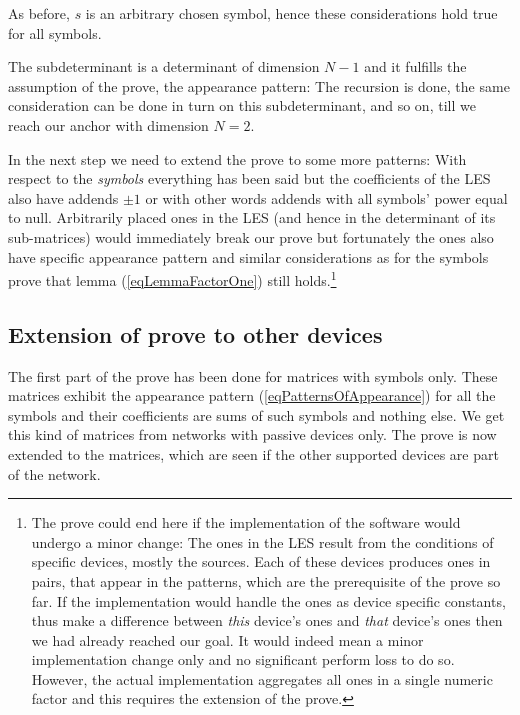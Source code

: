 As before, $s$ is an arbitrary chosen symbol, hence these considerations
hold true for all symbols.

The subdeterminant is a determinant of dimension $N-1$ and it fulfills the
assumption of the prove, the appearance pattern: The recursion is done,
the same consideration can be done in turn on this subdeterminant, and so
on, till we reach our anchor with dimension $N=2$.

In the next step we need to extend the prove to some more patterns: With
respect to the \emph{symbols} everything has been said but the
coefficients of the LES also have addends $\pm 1$ or with other words
addends with all symbols' power equal to null. Arbitrarily placed ones in
the LES (and hence in the determinant of its sub-matrices) would
immediately break our prove but fortunately the ones also have specific
appearance pattern and similar considerations as for the symbols prove
that lemma (\ref{eqLemmaFactorOne}) still holds.\footnote{The prove could
end here if the implementation of the software would undergo a minor
change: The ones in the LES result from the conditions of specific
devices, mostly the sources. Each of these devices produces ones in pairs,
that appear in the patterns, which are the prerequisite of the prove so
far. If the implementation would handle the ones as device specific
constants, thus make a difference between \emph{this} device's ones and
\emph{that} device's ones then we had already reached our goal. It would
indeed mean a minor implementation change only and no significant perform
loss to do so. However, the actual implementation aggregates all ones in a
single numeric factor and this requires the extension of the prove.}


\subsection{Extension of prove to other devices}

The first part of the prove has been done for matrices with symbols only.
These matrices exhibit the appearance pattern
(\ref{eqPatternsOfAppearance}) for all the symbols and their coefficients
are sums of such symbols and nothing else. We get this kind of matrices
from networks with passive devices only. The prove is now extended to the
matrices, which are seen if the other supported devices are part of the
network.


